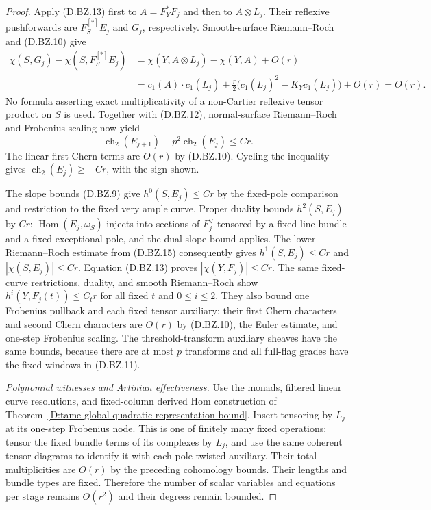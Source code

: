 \begin{proof}
Apply (D.BZ.13) first to $A=F_Y^*F_j$ and then to
$A\otimes L_j$.  Their reflexive pushforwards are
$F_S^{[*]}E_j$ and $G_j$, respectively.  Smooth-surface
Riemann--Roch and (D.BZ.10) give
\[
 \begin{split}
 \chi(S,G_j)-\chi(S,F_S^{[*]}E_j)
 &=\chi(Y,A\otimes L_j)-\chi(Y,A)+O(r)\\
 &=c_1(A)\cdot c_1(L_j)
   +\frac r2\bigl(c_1(L_j)^2-K_Yc_1(L_j)\bigr)+O(r)
   =O(r).
 \end{split}                                            \tag{D.BZ.14}
\]
No formula asserting exact multiplicativity of a
non-Cartier reflexive tensor product on $S$ is used.
Together with (D.BZ.12), normal-surface Riemann--Roch
and Frobenius scaling
\citep[Theorem~0.1]{C_Langer2026}
\citep[Theorem~4.5(2)]{C_Langer2025}
now yield
\[
       \operatorname{ch}_2(E_{j+1})
                   -p^2\operatorname{ch}_2(E_j)\le Cr.
                                                        \tag{D.BZ.15}
\]
The linear first-Chern terms are $O(r)$ by (D.BZ.10).
Cycling the inequality gives
$\operatorname{ch}_2(E_j)\ge-Cr$, with the sign shown.

The slope bounds (D.BZ.9) give $h^0(S,E_j)\le Cr$ by
the fixed-pole comparison and restriction to the fixed
very ample curve.  Proper duality bounds $h^2(S,E_j)$
by $Cr$: $\operatorname{Hom}(E_j,\omega_S)$ injects
into sections of $F_j^\vee$ tensored by a fixed line
bundle and a fixed exceptional pole, and the dual
slope bound applies.  The lower Riemann--Roch estimate
from (D.BZ.15) consequently gives
$h^1(S,E_j)\le Cr$ and $|\chi(S,E_j)|\le Cr$.
Equation (D.BZ.13) proves $|\chi(Y,F_j)|\le Cr$.
The same fixed-curve restrictions, duality, and smooth
Riemann--Roch show
$h^i(Y,F_j(t))\le C_t r$ for all fixed $t$ and $0\le i\le2$.
They also bound one Frobenius pullback and each fixed
tensor auxiliary: their first Chern characters and
second Chern characters are $O(r)$ by (D.BZ.10), the
Euler estimate, and one-step Frobenius scaling.
The threshold-transform auxiliary sheaves have the
same bounds, because there are at most $p$ transforms
and all full-flag grades have the fixed windows
in (D.BZ.11).

\emph{Polynomial witnesses and Artinian effectiveness.}
Use the monads, filtered linear curve resolutions,
and fixed-column derived Hom construction of
Theorem~\ref{D:tame-global-quadratic-representation-bound}.
Insert tensoring by $L_j$ at its one-step Frobenius
node.  This is one of finitely many fixed operations:
tensor the fixed bundle terms of its complexes by
$L_j$, and use the same coherent tensor diagrams
to identify it with each pole-twisted auxiliary.
Their total multiplicities are $O(r)$ by the preceding
cohomology bounds.  Their lengths and bundle types
are fixed.  Therefore the number of scalar variables
and equations per stage remains $O(r^2)$ and their
degrees remain bounded.


\end{proof}

